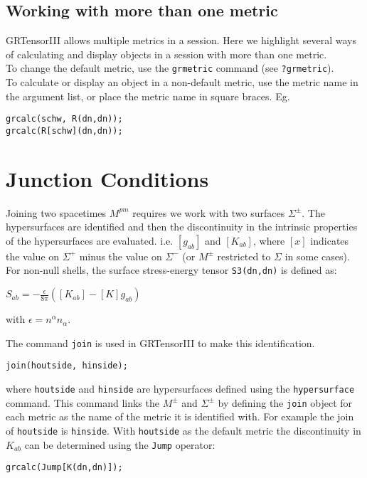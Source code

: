 \documentclass{article}
\begin{document}
\subsection{Working with more than one metric}
GRTensorIII allows multiple metrics in a session. Here we highlight several ways of calculating and display objects in a session
with more than one metric. \\

To change the default metric, use the \texttt{grmetric} command (see \texttt{?grmetric}).\\

To calculate or display an object in a non-default metric, use the metric name in the argument list, or place the metric name in 
square braces. Eg.
\begin{verbatim}
grcalc(schw, R(dn,dn));
grcalc(R[schw](dn,dn));
\end{verbatim}

\section{Junction Conditions}
Joining two spacetimes $M^{pm}$ requires we work with two surfaces $\Sigma^{\pm}$. The hypersurfaces are identified and then
the discontinuity in the intrinsic properties of the hypersurfaces are evaluated. i.e. $\left[ g_{ab} \right]$ and
$\left[ K_{ab} \right]$, where $\left[ x \right]$ indicates the value on  $\Sigma^{+}$ minus the value on $\Sigma^{-}$
(or $M^\pm$ restricted to $\Sigma$ in some cases). \\

For non-null shells, the surface stress-energy tensor \texttt{S3(dn,dn)} is defined as:
\begin{center}
$S_{ab} = - \frac{\epsilon}{8 \pi} \left( \left[K_{ab}\right] - \left[K\right]g_{ab} \right)$
\end{center}
with $\epsilon = n^\alpha n_\alpha$.

The command \texttt{join} is used in GRTensorIII to make this identification.
\begin{verbatim}
join(houtside, hinside);
\end{verbatim}
where \texttt{houtside} and \texttt{hinside} are hypersurfaces defined using the \texttt{hypersurface} command. This command
links the $M^\pm$ and $\Sigma^\pm$ by defining the \texttt{join} object for each metric as the name of the metric it is identified with. 
For example the join of \texttt{houtside} is \texttt{hinside}. With \texttt{houtside} as the default metric the discontinuity in $K_{ab}$ can be determined
using the \texttt{Jump} operator:
\begin{verbatim}
grcalc(Jump[K(dn,dn)]);
\end{verbatim}
\end{document}
